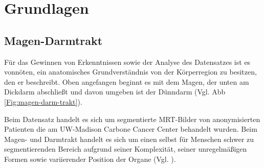 \section{Grundlagen}\raggedbottom

\subsection{Magen-Darmtrakt}

Für das Gewinnen von Erkenntnissen sowie der Analyse des Datensatzes ist es vonnöten, ein anatomisches Grundverständnis von der Körperregion zu besitzen, den er beschreibt. Oben angefangen beginnt es mit dem Magen, der unten am Dickdarm abschließt und davon umgeben ist der Dünndarm (Vgl. Abb \ref{Fig:magen-darm-trakt}). 

Beim Datensatz handelt es sich um segmentierte MRT-Bilder von anonymisierten Patienten die am UW-Madison Carbone Cancer Center behandelt wurden. Beim Magen- und Darmtrakt handelt es sich um einen selbst für Menschen schwer zu segmentierenden Bereich aufgrund seiner Komplexität, seiner unregelmäßigen Formen sowie variierender Position der Organe (Vgl. \cite{Chen_2020}).

